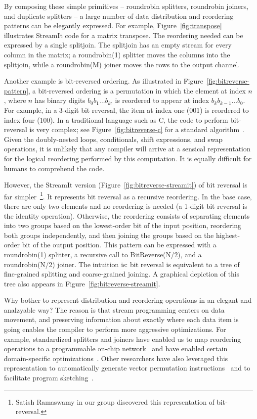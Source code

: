 By composing these simple primitives -- roundrobin splitters,
roundrobin joiners, and duplicate splitters -- a large number of data
distribution and reordering patterns can be elegantly expressed.  For
example, Figure~\ref{fig:transpose} illustrates StreamIt code for a
matrix transpose.  The reordering needed can be expressed by a single
splitjoin.  The splitjoin has an empty stream for every column in the
matrix; a roundrobin(1) splitter moves the columns into the splitjoin,
while a roundrobin(M) joiner moves the rows to the output channel.

Another example is bit-reversed ordering.  As illustrated in
Figure~\ref{fig:bitreverse-pattern}, a bit-reversed ordering is a
permutation in which the element at index $n$, where $n$ has binary
digits $b_0b_1 \dots b_k$, is reordered to appear at index $b_kb_{k-1}
\dots b_0$.  For example, in a 3-digit bit reversal, the item at index
one (001) is reordered to index four (100).  In a traditional language
such as C, the code to perform bit-reversal is very complex; see
Figure~\ref{fig:bitreverse-c} for a standard
algorithm~\cite{press_numerical_1992}.  Given the doubly-nested loops,
conditionals, shift expressions, and swap operations, it is unlikely
that any compiler will arrive at a sensical representation for the
logical reordering performed by this computation.  It is equally
difficult for humans to comprehend the code.

However, the StreamIt version (Figure~\ref{fig:bitreverse-streamit})
of bit reversal is far simpler~\footnote{Satish Ramaswamy in our group
  discovered this representation of bit-reversal.}.  It represents bit
reversal as a recursive reordering.  In the base case, there are only
two elements and no reordering is needed (a 1-digit bit reversal is
the identity operation).  Otherwise, the reordering consists of
separating elements into two groups based on the lowest-order bit of
the input position, reordering both groups independently, and then
joining the groups based on the highest-order bit of the output
position.  This pattern can be expressed with a roundrobin(1)
splitter, a recursive call to BitReverse(N/2), and a roundrobin(N/2)
joiner.  The intuition is: bit reversal is equivalent to a tree of
fine-grained splitting and coarse-grained joining.  A graphical
depiction of this tree also appears in
Figure~\ref{fig:bitreverse-streamit}.

Why bother to represent distribution and reordering operations in an
elegant and analzyable way?  The reason is that stream programming
centers on data movement, and preserving information about exactly
where each data item is going enables the compiler to perform more
aggressive optimizations.  For example, standardized splitters and
joiners have enabled us to map reordering operations to a programmable
on-chip network~\cite{streamit-asplos} and have enabled certain
domain-specific
optimizations~\cite{lamb:pldi:2003,agrawal:cases:2005,techreport}.
Other researchers have also leveraged this representation to
automatically generate vector permutation
instructions~\cite{mani-permutations} and to facilitate program
sketching~\cite{bit-streaming}.

